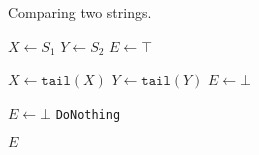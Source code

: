 
\begin{algorithm}[t]
  \caption{Comparing two strings.}
  \label{alg:equal}
  \begin{algorithmic}[1]
      \State $X \gets S_1$	\label{line:init-begin}
      \State $Y \gets S_2$
      \State $E \gets \top$	\label{line:init-end}
      \hStatex

      	\label{line:while-loop}
	  \label{line:while-begin}
	  \State $X \gets \texttt{tail}(X)$
	  \State $Y \gets \texttt{tail}(Y)$
	\Else
	  \State $E \gets \bot$
	\EndIf							\label{line:while-end}
      \EndWhile

      \hStatex
        \State $E \gets \bot$
      \Else
	\State \texttt{DoNothing}  
      \EndIf

      \hStatex
      \State \Return $E$
    \EndProcedure
  \end{algorithmic}
\end{algorithm}

